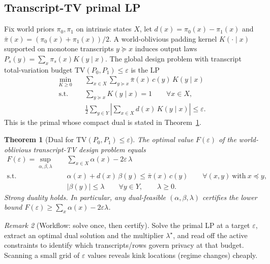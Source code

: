 \documentclass[11pt]{article}
\newtheorem{theorem}{Theorem}
\theoremstyle{definition}
\theoremstyle{remark}
\newtheorem{remark}[theorem]{Remark}
\newcommand{\TV}{\mathrm{TV}}
\begin{document}
\subsection{Transcript-TV primal LP}\label{sec:lp_global}
Fix world priors $\pi_0,\pi_1$ on intrinsic states $X$, let $d(x)=\pi_0(x)-\pi_1(x)$ and $\bar\pi(x)=(\pi_0(x)+\pi_1(x))/2$.
A world-oblivious padding kernel $K(\cdot\mid x)$ supported on monotone transcripts $y\succeq x$ induces output laws
$P_s(y)=\sum_x \pi_s(x)K(y\mid x)$.
The global design problem with transcript total-variation budget $\TV(P_0,P_1)\le \varepsilon$ is the LP
\begin{align}
\min_{K\ge 0}\quad & \sum_{x\in X}\sum_{y\succeq x} \bar\pi(x)\,c(y)\,K(y\mid x)\\
\text{s.t.}\quad & \sum_{y\succeq x} K(y\mid x)=1\qquad \forall x\in X,\\
& \frac12\sum_{y\in Y}\left|\sum_{x\in X} d(x)\,K(y\mid x)\right|\le \varepsilon.
\end{align}
This is the primal whose compact dual is stated in Theorem~\ref{thm:dual_general_eps}.

\begin{theorem}[Dual for \(\TV(P_0,P_1)\le \varepsilon\)]\label{thm:dual_general_eps}
The optimal value \(F(\varepsilon)\) of the world-oblivious transcript-TV design problem equals
\begin{align}
F(\varepsilon)=\sup_{\alpha,\beta,\lambda}\quad & \sum_{x\in X}\alpha(x)-2\varepsilon\,\lambda \label{eq:dual_eps_obj}\\
\text{s.t.}\quad & \alpha(x)+d(x)\,\beta(y)\le \bar\pi(x)\,c(y)\qquad \forall (x,y)\ \text{with}\ x\preceq y, \label{eq:dual_eps_constr}\\
& |\beta(y)|\le \lambda\qquad \forall y\in Y,\qquad \lambda\ge 0. \label{eq:dual_eps_box}
\end{align}
Strong duality holds. In particular, any dual-feasible \((\alpha,\beta,\lambda)\) certifies the lower bound \(F(\varepsilon)\ge \sum_x \alpha(x)-2\varepsilon\lambda\).
\end{theorem}

\begin{remark}[Workflow: solve once, then certify]
Solve the primal LP at a target $\varepsilon$, extract an optimal dual solution and the multiplier $\lambda^\star$, and read off the active constraints to identify which transcripts/rows govern privacy at that budget.
Scanning a small grid of $\varepsilon$ values reveals kink locations (regime changes) cheaply.
\end{remark}
\end{document}
